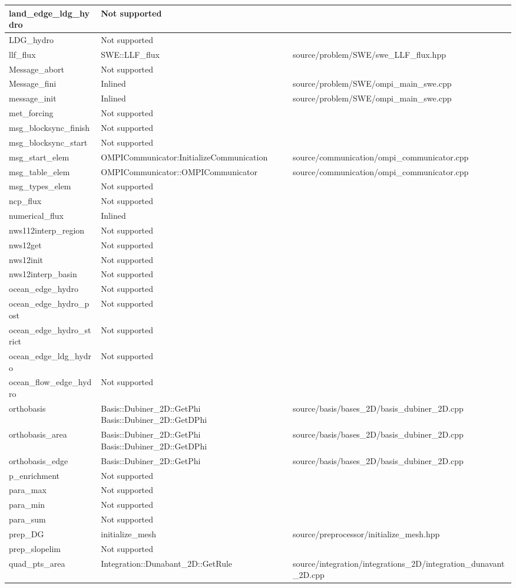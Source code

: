 {\begin{longtable}{ l | p{55mm} | p{86mm} }
\tabularnewline \hline
land\_edge\_ldg\_hydro & Not supported &
\tabularnewline \hline
LDG\_hydro & Not supported &
\tabularnewline \hline
llf\_flux & SWE::LLF\_flux & source/problem/SWE/swe\_LLF\_flux.hpp
\tabularnewline \hline
Message\_abort & Not supported	
\tabularnewline \hline
Message\_fini & Inlined & source/problem/SWE/ompi\_main\_swe.cpp
\tabularnewline \hline
message\_init & Inlined & source/problem/SWE/ompi\_main\_swe.cpp
\tabularnewline \hline
met\_forcing & Not supported	&
\tabularnewline \hline
msg\_blocksync\_finish & Not supported &	
\tabularnewline \hline
msg\_blocksync\_start & Not supported &
\tabularnewline \hline
msg\_start\_elem & OMPICommunicator:InitializeCommunication & source/communication/ompi\_communicator.cpp
\tabularnewline \hline
msg\_table\_elem & OMPICommunicator::OMPICommunicator & source/communication/ompi\_communicator.cpp
\tabularnewline \hline
msg\_types\_elem & Not supported &	
\tabularnewline \hline
ncp\_flux & Not supported &
\tabularnewline \hline
numerical\_flux & Inlined &	
\tabularnewline \hline
nws112interp\_region & Not supported	&
\tabularnewline \hline
nws12get & Not supported &
\tabularnewline \hline
nws12init & Not supported &
\tabularnewline \hline
nws12interp\_basin & Not supported &
\tabularnewline \hline
ocean\_edge\_hydro & Not supported &
\tabularnewline \hline
ocean\_edge\_hydro\_post & Not supported &
\tabularnewline \hline
ocean\_edge\_hydro\_strict	& Not supported &	
\tabularnewline \hline
ocean\_edge\_ldg\_hydro & Not supported &
\tabularnewline \hline
ocean\_flow\_edge\_hydro & Not supported &	
\tabularnewline \hline
orthobasis & Basis::Dubiner\_2D::GetPhi \newline Basis::Dubiner\_2D::GetDPhi &	source/basis/bases\_2D/basis\_dubiner\_2D.cpp
\tabularnewline \hline
orthobasis\_area & Basis::Dubiner\_2D::GetPhi \newline Basis::Dubiner\_2D::GetDPhi & source/basis/bases\_2D/basis\_dubiner\_2D.cpp
\tabularnewline \hline
orthobasis\_edge	& Basis::Dubiner\_2D::GetPhi & source/basis/bases\_2D/basis\_dubiner\_2D.cpp
\tabularnewline \hline
p\_enrichment & Not supported &
\tabularnewline \hline
para\_max & Not supported &	
\tabularnewline \hline
para\_min & Not supported &
\tabularnewline \hline
para\_sum & Not supported &	
\tabularnewline \hline
prep\_DG	& initialize\_mesh & source/preprocessor/initialize\_mesh.hpp
\tabularnewline \hline
prep\_slopelim & Not supported &	
\tabularnewline \hline
quad\_pts\_area & Integration::Dunabant\_2D::GetRule & 	source/integration/integrations\_2D/integration\_dunavant\_2D.cpp
\tabularnewline \hline

\end{longtable}}
